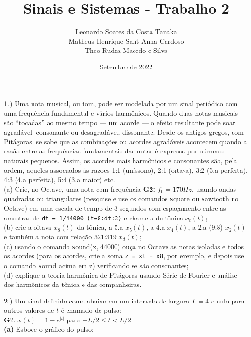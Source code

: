 \documentclass[10pt, a4paper]{article}
\title{Sinais e Sistemas - Trabalho 2}
\author{
    Leonardo Soares da Costa Tanaka\\
    Matheus Henrique Sant Anna Cardoso \\
    Theo Rudra Macedo e Silva
}
\date{Setembro de 2022}
\begin{document}
\maketitle

{\textbf 1.)} Uma nota musical, ou tom, pode ser modelada por um sinal periódico com uma frequência fundamental e vários harmônicos. Quando duas notas musicais são “tocadas” ao mesmo tempo — um acorde — o efeito resultante pode soar agradável, consonante ou desagradável, dissonante. Desde os antigos gregos, com Pitágoras, se sabe que as combinações ou acordes agradáveis acontecem quando a razão entre as frequências fundamentais das notas é expressa por números naturais pequenos. Assim, os acordes mais harmônicos e consonantes são, pela ordem, aqueles associados às razões 1:1 (uníssono), 2:1 (oitava), 3:2 (5.a perfeita), 4:3 (4.a perfeita), 5:4 (3.a maior) etc.\\
(a) Crie, no Octave, uma nota com frequência \textbf{G2:} $f_{0} = 170Hz$, usando ondas quadradas ou triangulares (pesquise e use os comandos {\texttt square} ou {\texttt sawtooth} no Octave) em uma escala de tempo de 3 segundos com espaçamento entre as amostras de {\texttt{dt = 1/44000 (t=0:dt:3)}} e chame-a de tônica $x_{t}(t)$;\\
(b) crie a oitava $x_{8}(t)$ da tônica, a 5.a $x_{5}(t)$, a 4.a $x_{4}(t)$, a 2.a (9:8) $x_{2}(t)$ e também a nota com relação 321:319 $x_{d}(t)$;\\
(c) usando o comando {\texttt sound(x, 44000)} ouça no Octave as notas isoladas e todos os acordes (para os acordes, crie a soma {\texttt{z = xt + x8}}, por exemplo, e depois use o comando {\texttt sound} acima em z) verificando se são consonantes;\\
(d) explique a teoria harmônica de Pitágoras usando Série de Fourier e análise dos harmônicos da tônica e das companheiras.

\vspace{\baselineskip}
{\textbf 2.)} Um sinal definido como abaixo em um intervalo de largura $L = 4$ e nulo para outros valores de $t$ é chamado de pulso:\\
{\textbf G2:} $x(t) = 1 - e^{|t|}$ para $- L/2 \leq t < L/2$\\
{\textbf{(a)}} Esboce o gráfico do pulso;
\end{document}

